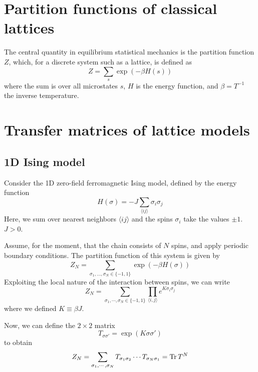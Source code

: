 \section{Partition functions of classical lattices}
The central quantity in equilibrium statistical mechanics is the partition
function $Z$, which, for a discrete system such as a lattice, is defined as
\begin{equation}
  Z = \sum_{s} \exp{(-\beta H(s))}
\end{equation}
where the sum is over all microstates $s$, $H$ is the energy function, and
$\beta = T^{-1}$ the inverse temperature.

\section{Transfer matrices of lattice models}

\subsection{1D Ising model}


Consider the 1D zero-field ferromagnetic Ising model, defined by the energy function
\begin{equation}\label{ising_energy_function}
  H(\sigma) = -J \sum_{\langle i j \rangle} \sigma_i \sigma_j
\end{equation}
Here, we sum over nearest neighbors $\langle i j \rangle$ and the spins
$\sigma_i$ take the values $\pm 1$. $J > 0$.

Assume, for the moment, that the chain
consists of $N$ spins, and apply periodic boundary conditions.
The partition function of this system is given by
\begin{equation}
  Z_{N} = \sum_{\sigma_1, \dotsc, \sigma_N \in \{-1, 1\}} \exp (-\beta H(\sigma))
\end{equation}
Exploiting the local nature of the interaction between spins, we can write
\begin{equation}
  Z_{N} = \sum_{\sigma_1, \cdots, \sigma_N \in \{-1, 1\}} \prod_{\langle i, j \rangle} e^{K\sigma_i \sigma_j}
\end{equation}
where we defined $K \equiv \beta J$.

Now, we can define
the $2 \times 2$ matrix
\begin{equation}\label{eq:transfer_matrix_1d_ising}
  T_{\sigma \sigma'} = \exp(K \sigma \sigma')
\end{equation}
to obtain
\begin{equation}
  Z_N = \sum_{\sigma_1, \cdots, \sigma_N} T_{\sigma_1 \sigma_2} \dotsm T_{\sigma_N \sigma_1} = \operatorname{Tr} T^N
\end{equation}

